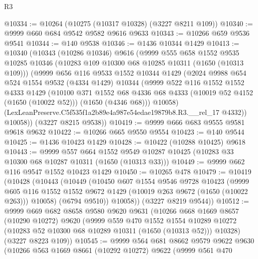\begin{lexlean}{R3}
\begin{coremodule}
@10334 := @10264 (@10275 (@10317 @10328) (@3227 @8211 @109))
@10340 := @9999 @660 @684 @9542 @9582 @9616 @9633
@10343 := @10266 @659 @9536 @9541
@10344 := @140 @9538
@10346 := @1436 @10344 @1429
@10413 := @10340
    (@10343
      (@10286 @10346)
      @9616
      (@9999
        @555
        @658
        @1552
        @9535
        @10285
        @10346
        (@10283 @109 @10300 @68 @10285 @10311 (@1650 (@10313 @109)))
        (@9999
          @656
          @116
          @9533
          @1552
          @10344
          @1429
          (@2024
            @9988
            @654
            @524
            @1554
            @9532
            (@4334 @1429)
            @10344
            (@9999
              @522
              @116
              @1552
              @1552
              @4333
              @1429
              (@10100
                @371
                @1552
                @68
                @4336
                @68
                @4333
                (@10019 @52 @4152 (@1650 (@10022 @52)))
                (@1650 (@4346 @68)))
              @10058)
            (LexLeanPreserve.C5f535f1a2b89e4a987e54edae19879b8.R3.__rel_17 @4332))
          @10058))
      (@3227 @8215 @9538))
@10419 := @9999 @666 @683 @9555 @9581 @9618 @9632
@10422 := @10266 @665 @9550 @9554
@10423 := @140 @9544
@10425 := @1436 @10423 @1429
@10428 := @10422 (@10288 @10425) @9618
@10443 := @9999
    @557
    @664
    @1552
    @9549
    @10287
    @10425
    (@10283 @33 @10300 @68 @10287 @10311 (@1650 (@10313 @33)))
@10449 := @9999 @662 @116 @9547 @1552 @10423 @1429
@10450 := @10265 @478
@10479 := @10419
    (@10428
      (@10443
        (@10449
          (@10450
            @607
            @1554
            @9546
            @9728
            @10423
            (@9999
              @605
              @116
              @1552
              @1552
              @9672
              @1429
              (@10019 @263 @9672 (@1650 (@10022 @263)))
              @10058)
            (@6794 @9510))
          @10058))
      (@3227 @8219 @9544))
@10512 := @9999
    @669
    @682
    @8658
    @9580
    @9620
    @9631
    (@10266
      @668
      @1669
      @8657
      (@10290 @10272)
      @9620
      (@9999
        @559
        @470
        @1552
        @1554
        @10289
        @10272
        (@10283 @52 @10300 @68 @10289 @10311 (@1650 (@10313 @52)))
        @10328)
      (@3227 @8223 @109))
@10545 := @9999
    @564
    @681
    @8662
    @9579
    @9622
    @9630
    (@10266
      @563
      @1669
      @8661
      (@10292 @10272)
      @9622
      (@9999
        @561
        @470

\end{coremodule}
\end{lexlean}
